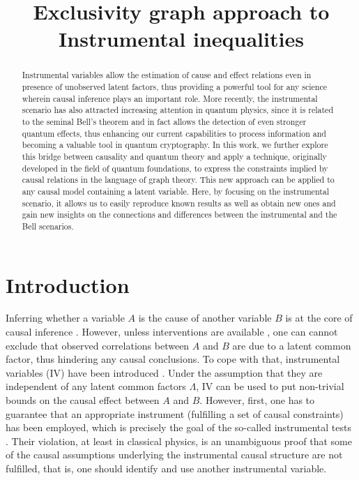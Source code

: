 \documentclass[letterpaper]{article}
\title{Exclusivity graph approach to Instrumental inequalities}
\author{} %
\begin{document}
\maketitle

\begin{abstract}
Instrumental variables allow the estimation of cause and effect relations even
in presence of unobserved latent factors, thus providing a powerful tool for any
science wherein causal inference plays an important role. More recently, the
instrumental scenario has also attracted increasing attention in quantum
physics, since it is related to the seminal Bell's theorem and in fact allows
the detection of even stronger quantum effects, thus enhancing our current
capabilities to process information and becoming a valuable tool in quantum
cryptography. In this work, we further explore this bridge between causality and
quantum theory and apply a technique, originally developed in the field of
quantum foundations, to express the constraints implied by causal relations in
the language of graph theory. This new approach can be applied to any causal
model containing a latent variable. Here, by focusing on the instrumental
scenario, it allows us to easily reproduce known results as well as obtain new
ones and gain new insights on the connections and differences between the
instrumental and the Bell scenarios. 
\end{abstract}

\section{Introduction}
Inferring  whether a variable $A$ is the cause of another variable $B$ is at the
core of causal inference \cite{Mooij}. However, unless interventions are available
\cite{pearlbook}, one can cannot exclude that observed correlations between $A$
and $B$ are due to a latent common factor, thus hindering any causal
conclusions. To cope with that, instrumental variables (IV) have been introduced
\cite{pearl1995, bonet2001}. Under the assumption that they are independent of
any latent common factors $\Lambda$, IV can be used to put non-trivial bounds on the
causal effect between $A$ and $B$. However, first, one has to guarantee that
an appropriate instrument (fulfilling a set of causal constraints) has been
employed, which is precisely the goal of the so-called instrumental tests
\cite{pearl1995, bonet2001,Ramsahai2012,Kedagni2017}. Their violation, at least in classical physics, is
an unambiguous proof that some of the causal assumptions underlying the
instrumental causal structure are not fulfilled, that is, one should identify
and use another instrumental variable.
\end{document}
